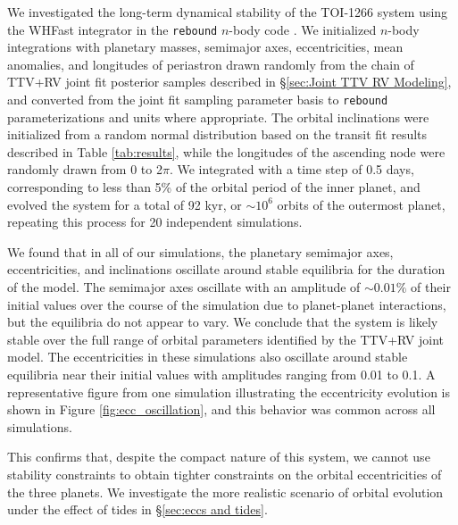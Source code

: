 \documentclass[twocolumn]{aastex631}
\begin{document}
We investigated the long-term dynamical stability of the TOI-1266 system using the WHFast integrator in the \texttt{rebound} $n$-body code \citep{rebound}. We initialized $n$-body integrations with planetary masses, semimajor axes, eccentricities, mean anomalies, and longitudes of periastron drawn randomly from the chain of TTV+RV joint fit posterior 
samples described in \S\ref{sec:Joint TTV RV Modeling}, and converted from the joint fit sampling parameter basis to 
\texttt{rebound} parameterizations and units where appropriate. The orbital inclinations were initialized from a random normal distribution 
based on the transit fit results described in Table \ref{tab:results}, while the longitudes of the ascending node were randomly drawn from 0 to 2$\pi$. We integrated with a time step of 0.5 days, corresponding to less than 5\% of the orbital period of the inner planet, and evolved the system for a total of 92 kyr, or $\sim 10^6$ orbits of the outermost planet, repeating this process for 20 independent simulations. 

We found that in all of our simulations, the planetary semimajor axes, eccentricities, and inclinations oscillate around stable equilibria for the duration of the model. The semimajor axes oscillate with an amplitude of $\sim0.01\%$ of their initial values over the course of the simulation due to planet-planet interactions, but the equilibria do not appear to vary. We conclude that the system is likely stable over the full range of orbital parameters identified by the TTV+RV joint model. The eccentricities in these simulations also oscillate around stable equilibria near their initial values with amplitudes ranging from 0.01 to 0.1. A representative figure from one simulation illustrating the eccentricity evolution is shown in Figure \ref{fig:ecc_oscillation}, and this behavior was common across all simulations. 

This confirms that, despite the compact nature of this system, we cannot use stability constraints to obtain tighter constraints on the orbital eccentricities of the three planets. 
We investigate the more realistic scenario of orbital evolution under the effect of tides in \S\ref{sec:eccs and tides}.
\end{document}
